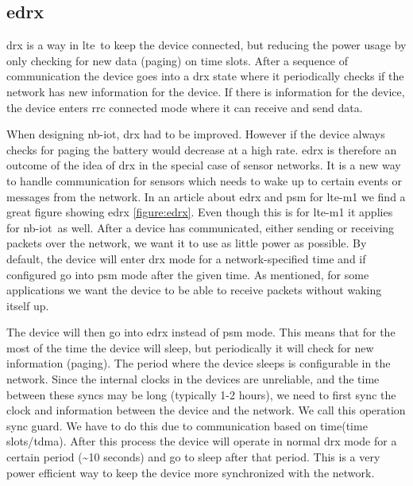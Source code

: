 \documentclass[USenglish]{ifimaster}  %
\begin{document}
\subsection[\acrlong{edrx}]{\acrfull{edrx}} \label{ssection:edrx}
\acrfull{drx} is a way in \acrshort{lte} to keep the device connected, but reducing the power usage by only checking for new data (paging) on time slots. After a sequence of communication the device goes into a \acrshort{drx} state where it periodically checks if the network has new information for the device. If there is information for the device, the device enters \acrshort{rrc} connected mode where it can receive and send data.

When designing \acrshort{nb-iot}, \acrshort{drx} had to be improved. However if the device always checks for paging the battery would decrease at a high rate. \acrshort{edrx} is therefore an outcome of the idea of \acrshort{drx} in the special case of sensor networks. It is a new way to handle communication for sensors which needs to wake up to certain events or messages from the network. In an article about \acrshort{edrx} and \acrshort{psm} for \acrshort{lte-m1} we find a great figure showing \acrshort{edrx} \vref{figure:edrx}. Even though this is for \acrshort{lte-m1} it applies for \acrshort{nb-iot} as well. After a device has communicated, either sending or receiving packets over the network, we want it to use as little power as possible. By default, the device will enter \acrshort{drx} mode for a network-specified time and if configured go into \acrshort{psm} mode after the given time. As mentioned, for some applications we want the device to be able to receive packets without waking itself up.

The device will then go into \acrshort{edrx} instead of \acrshort{psm} mode. This means that for the most of the time the device will sleep, but periodically it will check for new information (paging). The period where the device sleeps is configurable in the network. Since the internal clocks in the devices are unreliable, and the time between these syncs may be long (typically 1-2 hours), we need to first sync the clock and information between the device and the network. We call this operation sync guard. We have to do this due to communication based on time(time slots/\acrlong{tdma}). After this process the device will operate in normal \acrshort{drx} mode for a certain period (\textasciitilde10 seconds) and go to sleep after that period. This is a very power efficient way to keep the device more synchronized with the network.
\end{document}
